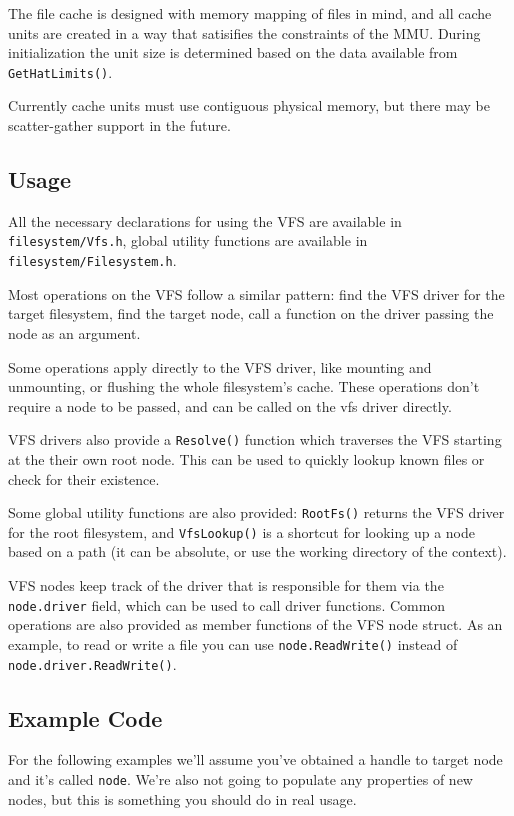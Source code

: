 The file cache is designed with memory mapping of files in mind, and all cache units are created in a way that satisifies the constraints of the MMU. During initialization the unit size is determined based on the data available from \verb|GetHatLimits()|.

Currently cache units must use contiguous physical memory, but there may be scatter-gather support in the future.

\subsection{Usage}
All the necessary declarations for using the VFS are available in \verb|filesystem/Vfs.h|, global utility functions are available in \verb|filesystem/Filesystem.h|.

Most operations on the VFS follow a similar pattern: find the VFS driver for the target filesystem, find the target node, call a function on the driver passing the node as an argument.

Some operations apply directly to the VFS driver, like mounting and unmounting, or flushing the whole filesystem's cache. These operations don't require a node to be passed, and can be called on the vfs driver directly.

VFS drivers also provide a \verb|Resolve()| function which traverses the VFS starting at the their own root node. This can be used to quickly lookup known files or check for their existence.

Some global utility functions are also provided: \verb|RootFs()| returns the VFS driver for the root filesystem, and \verb|VfsLookup()| is a shortcut for looking up a node based on a path (it can be absolute, or use the working directory of the context).

VFS nodes keep track of the driver that is responsible for them via the \verb|node.driver| field, which can be used to call driver functions. Common operations are also provided as member functions of the VFS node struct. As an example, to read or write a file you can use \verb|node.ReadWrite()| instead of \verb|node.driver.ReadWrite()|.

\subsection{Example Code}
For the following examples we'll assume you've obtained a handle to target node and it's called \verb|node|. We're also not going to populate any properties of new nodes, but this is something you should do in real usage.

